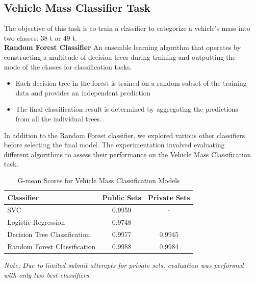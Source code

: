\documentclass[conference]{IEEEtran}
\begin{document}
\subsection{Vehicle Mass Classifier Task}\label{task:classifier}



The objective of this task is to train a classifier to categorize a vehicle's mass into two classes: 38 t or 49 t. \\
\noindent \textbf{Random Forest Classifier} \hspace{0.2em} An ensemble learning algorithm that operates by constructing a multitude of decision trees during training and outputting the mode of the classes for classification tasks.


\begin{itemize}
\item Each decision tree in the forest is trained on a random subset of the training data and provides an independent prediction
\item The final classification result is determined by aggregating the predictions from all the individual trees.
\end{itemize}

In addition to the Random Forest classifier, we explored various other classifiers before selecting the final model. The experimentation involved evaluating different algorithms to assess their performance on the Vehicle Mass Classification task. 

\begin{table}[ht]
    \centering
    \caption{G-mean Scores for Vehicle Mass Classification Models}
    \begin{tabular}{lcc}
    \toprule
    \textbf{Classifier} & \textbf{Public Sets} & \textbf{Private Sets} \\
    \midrule
    SVC & 0.9959 & - \\
    Logistic Regression & 0.9748 & - \\
    Decision Tree Classification & 0.9977 & 0.9945 \\
    Random Forest Classification & 0.9988 & 0.9984 \\
    \bottomrule
    \end{tabular}
    \begin{flushleft}
        \small\textit{Note: Due to limited submit attempts for private sets, evaluation was performed with only two best classifiers.}
        \end{flushleft}
    \label{tab:gmean-scores}
\end{table}
    
\end{document}
